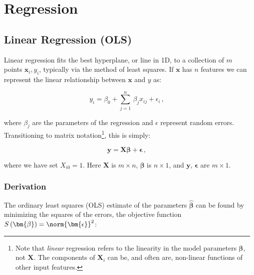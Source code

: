 \chapter{Regression}
\label{chap:regression}

\section{Linear Regression (OLS)}
\label{regression:linear}

Linear regression fits the best hyperplane, or line in 1D,
to a collection of $m$ points $\mathbf{x}_{i}, y_{i}$,
typically via the method of least squares.
If $\mathbf{x}$ has $n$ features we can represent the
linear relationship between $\mathbf{x}$ and $y$ as:

\begin{equation}\label{eq:linear:one_point}
y_{i} = \beta_{0} + \sum_{j=1}^{n}\, \beta_{j} x_{ij} + \epsilon_{i}\,,
\end{equation}

\noindent where $\beta_{j}$ are the parameters of the regression
and $\epsilon$ represent random errors.
Transitioning to matrix notation\footnote{Note
that \textit{linear} regression refers to the linearity in the model parameters
$\bm{\beta}$, not $\mathbf{X}$.
The components of $\mathbf{X}_{i}$ can be, and often are,
non-linear functions of other input features.}, this is simply:

\begin{equation}\label{eq:linear:matrix}
\mathbf{y} = \mathbf{X} \bm{\beta} + \bm{\epsilon}\,,
\end{equation}

\noindent where we have set $X_{i0} =1$.
Here $\mathbf{X}$ is $m \times n$,
$\bm{\beta}$ is $n \times 1$,
and $\mathbf{y}$, $\bm{\epsilon}$ are $m \times 1$.

\subsection{Derivation}
\label{regression:linear:derivation}

The ordinary least squares (OLS) estimate of the parameters $\hat{\bm{\beta}}$
can be found by minimizing the squares of the errors,
\ie the objective function $S\left(\bm{\beta}\right) = \norm{\bm{\epsilon}}^{2}$:

